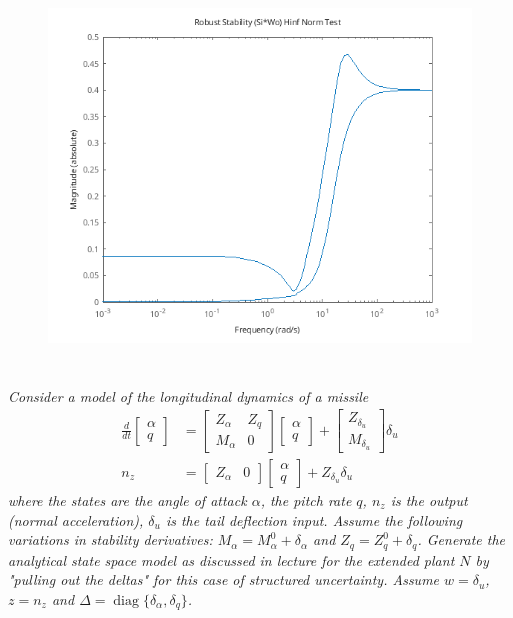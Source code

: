 \documentclass{article}
\begin{document}
\begin{figure}[H]
    \centering
    \includegraphics[width=\textwidth]{1stability.png}
    \label{fig:1stability}
\end{figure}

\section{}
\textit{Consider a model of the longitudinal dynamics of a missile
\[
\begin{aligned}
\frac{d}{d t} \begin{bmatrix} \alpha \\ q \end{bmatrix} &= \begin{bmatrix} Z_\alpha & Z_q \\ M_\alpha & 0 \end{bmatrix} \begin{bmatrix} \alpha \\ q \end{bmatrix} + \begin{bmatrix} Z_{\delta_u} \\ M_{\delta_u} \end{bmatrix} \delta_u \\
n_z &= \begin{bmatrix} Z_\alpha & 0 \end{bmatrix} \begin{bmatrix} \alpha \\ q \end{bmatrix} + Z_{\delta_u} \delta_u
\end{aligned}
\]
where the states are the angle of attack $\alpha$, the pitch rate $q$, $n_z$ is the output (normal acceleration), $\delta_u$ is the tail deflection input. Assume the following variations in stability derivatives: $M_\alpha = M_\alpha^0 + \delta_\alpha$ and $Z_q = Z_q^0 + \delta_q$. Generate the analytical state space model as discussed in lecture for the extended plant $N$ by "pulling out the deltas" for this case of structured uncertainty. Assume $w = \delta_u$, $z = n_z$ and $\Delta = \operatorname{diag}\{\delta_\alpha, \delta_q\}$.}
\end{document}
